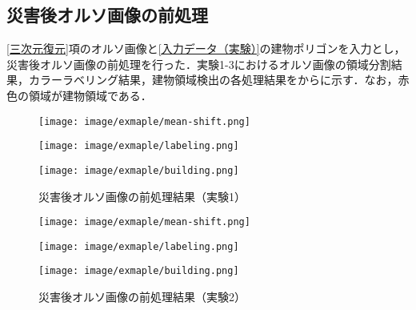     \subsection*{災害後オルソ画像の前処理}
      \label{災害後オルソ画像の前処理}
      \ref{三次元復元}項のオルソ画像と\ref{入力データ（実験）}の建物ポリゴンを入力とし，災害後オルソ画像の前処理を行った．実験1-3におけるオルソ画像の領域分割結果，カラーラベリング結果，建物領域検出の各処理結果をからに示す．なお，赤色の領域が建物領域である．

      \begin{figure}[t]
        \begin{minipage}[c]{0.329\hsize}
          \centering
          \texttt{[image: image/exmaple/mean-shift.png]}
        \end{minipage}
        \begin{minipage}[c]{0.329\hsize}
          \centering
          \texttt{[image: image/exmaple/labeling.png]}
        \end{minipage}
        \begin{minipage}[c]{0.329\hsize}
          \centering
          \texttt{[image: image/exmaple/building.png]}
        \end{minipage}
        \caption{災害後オルソ画像の前処理結果（実験1）}
        \label{災害後オルソ画像の前処理結果（実験1）}
      \end{figure}

      \begin{figure}[t]
        \begin{minipage}[c]{0.329\hsize}
          \centering
          \texttt{[image: image/exmaple/mean-shift.png]}
        \end{minipage}
        \begin{minipage}[c]{0.329\hsize}
          \centering
          \texttt{[image: image/exmaple/labeling.png]}
        \end{minipage}
        \begin{minipage}[c]{0.329\hsize}
          \centering
          \texttt{[image: image/exmaple/building.png]}
        \end{minipage}
        \caption{災害後オルソ画像の前処理結果（実験2）}      
      \end{figure}

